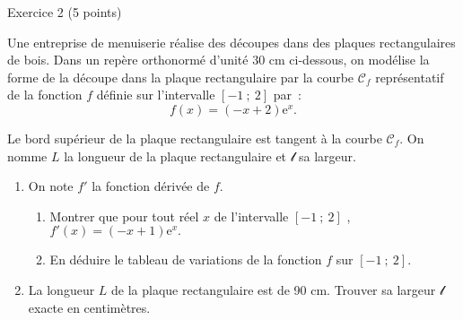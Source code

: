 
%
\begin{h2}Exercice  2 (5 points)\end{h2}
Une entreprise de menuiserie réalise des découpes dans des plaques rectangulaires de bois.
\newpar
Dans un repère orthonormé d'unité 30 cm ci-dessous, on modélise la forme de la découpe dans la plaque rectangulaire par la courbe $ \mathscr{C}_{ f }$ représentatif de la fonction  $f$ définie sur l'intervalle $[  - 1~;~2 ]$ par~:
\[
f( x )=(  - x+2 )\text{e}^{ x }.   
\]
\begin{center}
\end{center}
Le bord supérieur de la plaque rectangulaire est tangent à la courbe $ \mathscr{C}_{ f }$. On nomme $L$ la longueur de la plaque rectangulaire et $ \mathscr{l}$ sa largeur.
\begin{enumerate}
     \item
     On note $f' $ la fonction dérivée de  $f$.
     \begin{enumerate}[label=\alph*.]
          \item
          Montrer que pour tout réel $x$ de l'intervalle $[  - 1~;~2 ]$ , $f' ( x )=(  - x+1 )\text{e}^{ x }. $
          \item
          En déduire le tableau de variations de la fonction $f$ sur $[  - 1~;~2 ].$
     \end{enumerate}
     \item
     La longueur $L$ de la plaque rectangulaire est de 90 cm. Trouver sa largeur $ \mathscr{l}$ exacte en centimètres.
\end{enumerate}
